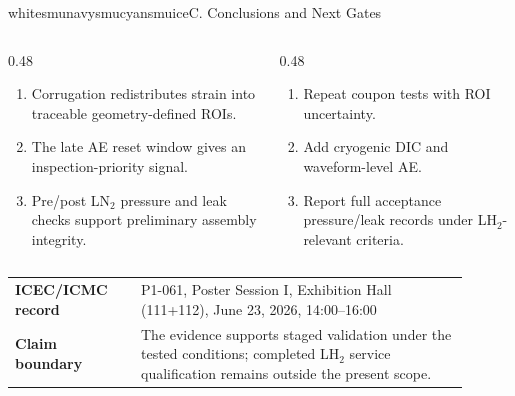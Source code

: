 \begin{posterblock}{white}{smunavy}{smucyan}{smuice}{C. Conclusions and Next Gates}
\begin{columns}[t,totalwidth=\linewidth]
\begin{column}{0.48\linewidth}
\begin{enumerate}\tightlist
\item Corrugation redistributes strain into traceable geometry-defined ROIs.
\item The late AE reset window gives an inspection-priority signal.
\item Pre/post LN$_2$ pressure and leak checks support preliminary assembly integrity.
\end{enumerate}
\end{column}
\hfill
\begin{column}{0.48\linewidth}
\begin{enumerate}\tightlist
\item Repeat coupon tests with ROI uncertainty.
\item Add cryogenic DIC and waveform-level AE.
\item Report full acceptance pressure/leak records under LH$_2$-relevant criteria.
\end{enumerate}
\end{column}
\end{columns}

\vspace{0.8ex}
\compacttable
\renewcommand{\arraystretch}{1.08}
\begin{tabular}{@{}>{\bfseries}p{0.25\linewidth}p{0.65\linewidth}@{}}
\toprule
ICEC/ICMC record & P1-061, Poster Session I, Exhibition Hall (111+112), June 23, 2026, 14:00--16:00 \\
Claim boundary & The evidence supports staged validation under the tested conditions; completed LH$_2$ service qualification remains outside the present scope. \\
\bottomrule
\end{tabular}
\end{posterblock}
